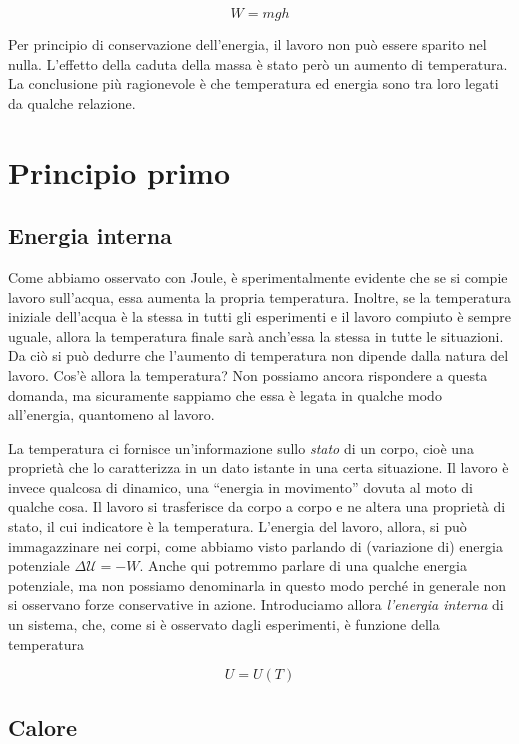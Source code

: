 \[ W = mgh \]

\noindent Per principio di conservazione dell'energia, il lavoro non
può essere sparito nel nulla. L'effetto della caduta della massa è stato però un aumento di temperatura.
La conclusione più ragionevole è che temperatura ed energia sono tra
loro legati da qualche relazione.




\section{Principio primo}
\subsection{Energia interna}
Come abbiamo osservato con Joule, è sperimentalmente evidente che
se si compie lavoro sull'acqua, essa
aumenta la propria temperatura. Inoltre, se la temperatura iniziale
dell'acqua è la stessa in tutti gli esperimenti e il lavoro compiuto
è sempre uguale, allora la temperatura finale sarà anch'essa la stessa
in tutte le situazioni. Da ciò si può dedurre che l'aumento di
temperatura non dipende dalla natura del lavoro. Cos'è allora la
temperatura? Non possiamo ancora rispondere a questa domanda, ma
sicuramente sappiamo che essa è legata in qualche modo all'energia,
quantomeno al lavoro.

La temperatura ci fornisce un'informazione sullo \textit{stato} di
un corpo, cioè una proprietà che lo caratterizza in un dato istante
in una certa situazione. Il lavoro è invece qualcosa di dinamico,
una ``energia in movimento'' dovuta al moto di qualche cosa. Il
lavoro si trasferisce da corpo a corpo e ne altera una proprietà di
stato, il cui indicatore è la temperatura. L'energia del lavoro,
allora, si può immagazzinare nei corpi, come abbiamo visto parlando
di (variazione di) energia potenziale $\Delta\mathcal{U} = -W$.
Anche qui potremmo parlare di una qualche energia potenziale, ma
non possiamo denominarla in questo modo perché in generale non
si osservano forze conservative in azione. Introduciamo allora
\textit{l'energia interna} di un sistema, che, come si è osservato
dagli esperimenti, è funzione della temperatura

\[ U = U(T) \]

\subsection{Calore}



